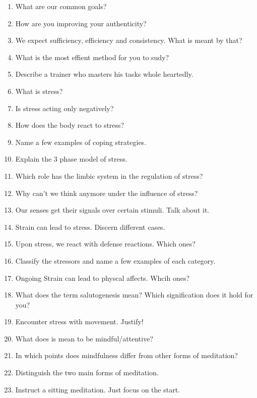 \documentclass[../main.tex]{subfiles}
\begin{document}
\begin{enumerate}
\item What are our common goals?
\item How are you improving your authenticity?
\item We expect sufficiency, efficiency and consistency. What is meant by that?
\item What is the most effient method for you to sudy?
\item Describe a trainer who masters his tasks whole heartedly.
  \vspace{0.4cm}
\item What is stress?
\item  Is stress acting only negatively?
\item How does the body react to stress?
\item Name a few examples of coping strategies.
\item Explain the 3 phase model of stress.
\item Which role has the limbic system in the regulation of stress?
  \vspace{0.4cm}
\item Why can't we think anymore under the influence of stress?
\item  Our senses get their signals over certain stimuli. Talk about it.
\item Strain can lead to stress. Discern different cases.
\item Upon stress, we react with defense reactions. Which ones?
  \vspace{0.4cm}
\item Classify the stressors and name a few examples of each category.
\item Ongoing Strain can lead to physcal affects. Whcih ones?
  \vspace{0.4cm}
\item What does the term salutogenesis mean? Which signification does it hold for you?
  \vspace{0.4cm}
\item Encounter stress with movement. Justify!
  \vspace{0.4cm}
\item What does is mean to be mindful/attentive?
\item In which points does mindfulness differ from other forms of meditation?
\item Distinguish the two main forms of meditation.
\item Instruct a sitting meditation. Just focus on the start.

\end{enumerate}
\end{document}
